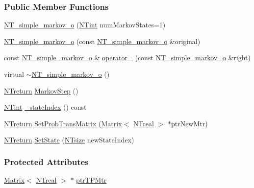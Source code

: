 \subsubsection*{Public Member Functions}
\begin{DoxyCompactItemize}
\item 
\hyperlink{class_n_t__simple__markov__o_a3753d63af02a021cb6ed1dad4f13eda0}{NT\_\-simple\_\-markov\_\-o} (\hyperlink{nt__types_8h_aee8aa0a9869e8b5c97c6c02217ff09cd}{NTint} numMarkovStates=1)
\item 
\hyperlink{class_n_t__simple__markov__o_a4f20765caf837529206b1832aaa88f74}{NT\_\-simple\_\-markov\_\-o} (const \hyperlink{class_n_t__simple__markov__o}{NT\_\-simple\_\-markov\_\-o} \&original)
\item 
const \hyperlink{class_n_t__simple__markov__o}{NT\_\-simple\_\-markov\_\-o} \& \hyperlink{class_n_t__simple__markov__o_ad6216f3868c7758acab50dbc7ee56594}{operator=} (const \hyperlink{class_n_t__simple__markov__o}{NT\_\-simple\_\-markov\_\-o} \&right)
\item 
virtual \hyperlink{class_n_t__simple__markov__o_a700dfa46df860bccc5ead19e039838be}{$\sim$NT\_\-simple\_\-markov\_\-o} ()
\item 
\hyperlink{nt__types_8h_ab9564ee8f091e809d21b8451c6683c53}{NTreturn} \hyperlink{class_n_t__simple__markov__o_a361c11a879c5b58b0a1534cd01b9127b}{MarkovStep} ()
\item 
\hyperlink{nt__types_8h_aee8aa0a9869e8b5c97c6c02217ff09cd}{NTint} \hyperlink{class_n_t__simple__markov__o_a4d1935aa5b4d46dfbdcf0cd63de54e28}{\_\-stateIndex} () const 
\item 
\hyperlink{nt__types_8h_ab9564ee8f091e809d21b8451c6683c53}{NTreturn} \hyperlink{class_n_t__simple__markov__o_a42097cf0e4df2ab7e6ba8129baaa5f19}{SetProbTransMatrix} (\hyperlink{class_t_n_t_1_1_matrix}{Matrix}$<$ \hyperlink{nt__types_8h_a814a97893e9deb1eedcc7604529ba80d}{NTreal} $>$ $\ast$ptrNewMtr)
\item 
\hyperlink{nt__types_8h_ab9564ee8f091e809d21b8451c6683c53}{NTreturn} \hyperlink{class_n_t__simple__markov__o_af8e1a0ff1d55555f2fef387795ba8cf7}{SetState} (\hyperlink{nt__types_8h_a06c124f2e4469769b58230253ce0560b}{NTsize} newStateIndex)
\end{DoxyCompactItemize}
\subsubsection*{Protected Attributes}
\begin{DoxyCompactItemize}
\item 
\hyperlink{class_t_n_t_1_1_matrix}{Matrix}$<$ \hyperlink{nt__types_8h_a814a97893e9deb1eedcc7604529ba80d}{NTreal} $>$ $\ast$ \hyperlink{class_n_t__simple__markov__o_af2278c737d8230521f4d8740dd78faff}{ptrTPMtr}
\end{DoxyCompactItemize}


